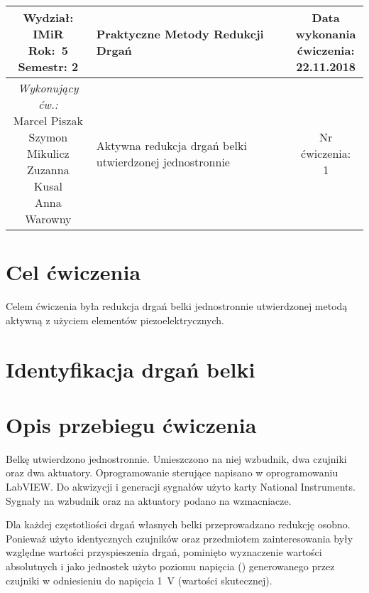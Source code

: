 \documentclass[polish,a4paper,11pt]{mwart}
\let\Oldsection\section
\renewcommand{\section}{\FloatBarrier\Oldsection}
\begin{document}
	\begin{table}[h] %
	\centering
		\begin{tabular}{ | c |  >{\centering\arraybackslash}m{5.5cm} | c | }
			\hline
			\makecell{ \textbf{Wydział:} \\ IMiR \\ \textbf{Rok:}~5 \\ Semestr: 2 } &
			\textbf{\large{Praktyczne Metody Redukcji Drgań}} &
			\makecell{Data \\ wykonania \\ ćwiczenia: \\ 22.11.2018} \\ \hline
      \makecell{\emph{Wykonujący ćw.:} \\ Marcel Piszak \\ Szymon Mikulicz \\ Zuzanna Kusal \\ Anna Warowny} &
			\large{Aktywna redukcja drgań belki utwierdzonej jednostronnie} &
			\makecell{Nr ćwiczenia: \\ 1} \\ \hline
		\end{tabular}
	\end{table}

  \section{Cel ćwiczenia}

  Celem ćwiczenia była redukcja drgań belki jednostronnie utwierdzonej metodą
  aktywną z użyciem elementów piezoelektrycznych.

  \section{Identyfikacja drgań belki}

  \section{Opis przebiegu ćwiczenia}

  Belkę utwierdzono jednostronnie. Umieszczono na niej wzbudnik, dwa czujniki
  oraz dwa aktuatory. Oprogramowanie sterujące napisano w oprogramowaniu
  LabVIEW\textregistered. Do akwizycji i generacji sygnałów użyto karty
  National Instruments\textregistered. Sygnały na wzbudnik oraz na aktuatory
  podano na wzmacniacze. 

  Dla każdej częstotliości drgań własnych belki przeprowadzano redukcję osobno.
  Ponieważ użyto identycznych czujników oraz przedmiotem zainteresowania były
  względne wartości przyspieszenia drgań, pominięto wyznaczenie wartości
  absolutnych i jako jednostek użyto poziomu napięcia (\si{\decibelV})
  generowanego przez czujniki w odniesieniu do napięcia \SI{1}{\volt} (wartości
  skutecznej). 
\end{document}
